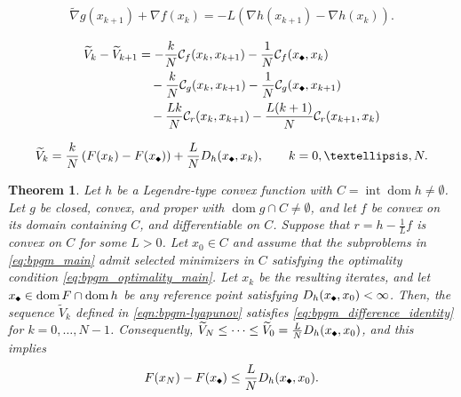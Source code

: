 \documentclass[10pt,a4paper]{amsart}
\newtheorem{theorem}{Theorem}
\newcommand{\bregaux}{r}
\newcommand{\bregprox}{g}
\newcommand{\bregsm}{f}
\newcommand{\cC}{{\mathcal{C}}}
\newcommand{\compidx}{%
  \mathord{\mathchoice
    {\vcenter{\hbox{\rotatebox{45}{\rule{0.39em}{0.39em}}}}}
    {\vcenter{\hbox{\rotatebox{45}{\rule{0.39em}{0.39em}}}}}
    {\vcenter{\hbox{\rotatebox{45}{\rule{0.29em}{0.29em}}}}}
    {\vcenter{\hbox{\rotatebox{45}{\rule{0.23em}{0.23em}}}}}}%
}
\newcommand{\pr}[1]{\left( #1 \right)}
\newcommand{\tnabla}{\widetilde{\nabla}}
\begin{document}
\begin{align}
\label{eq:bpgm_optimality_main}
    \tnabla \bregprox(x_{k+1})+\nabla \bregsm(x_k)
    =-L\pr{\nabla h(x_{k+1})-\nabla h(x_k)}.
\end{align}

\begin{align}
\label{eq:bpgm_difference_identity}
\begin{aligned}
    \widetilde V_k-\widetilde V_{k+1}
    & =
    -\frac{k}{N}\cC_{\bregsm}(x_k,x_{k+1})
    -\frac{1}{N}\cC_{\bregsm}(x_{\compidx},x_k) \\
    & \quad 
    -\frac{k}{N}\cC_{\bregprox}(x_k,x_{k+1})
    -\frac{1}{N}\cC_{\bregprox}(x_{\compidx},x_{k+1}) \\
    & \quad 
    -\frac{Lk}{N}\cC_{\bregaux}(x_k,x_{k+1})
    -\frac{L(k+1)}{N} \cC_{\bregaux}(x_{k+1},x_k)
\end{aligned}
\end{align}

\begin{align}
\label{eqn:bpgm-lyapunov}
    \widetilde V_k=\frac{k}{N}\pr{F(x_k)-F(x_{\compidx})}+\frac{L}{N}D_h(x_{\compidx},x_k),
    \qquad k=0,\dots,N.
\end{align}

\begin{theorem}
\label{theorem:bpgm-lyapunov}
Let $h$ be a Legendre-type convex function with $C=\operatorname{int}\operatorname{dom}h\neq\emptyset$.
Let $\bregprox$ be closed, convex, and proper with $\operatorname{dom}\bregprox\cap C\neq\emptyset$, and let $\bregsm$ be convex on its domain containing $C$, and differentiable on $C$.
Suppose that $\bregaux=h-\frac{1}{L}\bregsm$ is convex on $C$ for some $L>0$.
Let $x_0 \in C$ and assume that the subproblems in \eqref{eq:bpgm_main} admit selected minimizers in $C$ satisfying the optimality condition \eqref{eq:bpgm_optimality_main}.
Let $x_k$ be the resulting iterates, and let $x_{\compidx}\in\operatorname{dom}F\cap\operatorname{dom}h$ be any reference point satisfying $D_h(x_{\compidx},x_0)<\infty$.
Then, the sequence $\widetilde V_k$ defined in \eqref{eqn:bpgm-lyapunov} satisfies \eqref{eq:bpgm_difference_identity} for $k=0,\dots,N-1$.
Consequently, $\widetilde V_N\le\cdots\le \widetilde V_0=\frac{L}{N}D_h(x_{\compidx},x_0)$, and this implies
\[
    F(x_N)-F(x_{\compidx})\le \frac{L}{N}D_h(x_{\compidx},x_0).
\]
\end{theorem}
\end{document}
